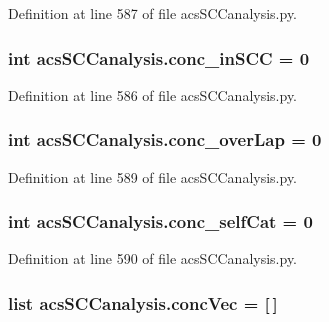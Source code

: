 Definition at line 587 of file acs\+S\+C\+Canalysis.\+py.

\hypertarget{a00130_a3fcb8f9c7e88b5c53f1201a383b38666}{
\subsubsection[{conc\+\_\+in\+S\+C\+C}]{\setlength{\rightskip}{0pt plus 5cm}int acs\+S\+C\+Canalysis.\+conc\+\_\+in\+S\+C\+C = 0}}\label{a00130_a3fcb8f9c7e88b5c53f1201a383b38666}


Definition at line 586 of file acs\+S\+C\+Canalysis.\+py.

\hypertarget{a00130_afd3169174539244248b78c8da2bba265}{
\subsubsection[{conc\+\_\+over\+Lap}]{\setlength{\rightskip}{0pt plus 5cm}int acs\+S\+C\+Canalysis.\+conc\+\_\+over\+Lap = 0}}\label{a00130_afd3169174539244248b78c8da2bba265}


Definition at line 589 of file acs\+S\+C\+Canalysis.\+py.

\hypertarget{a00130_a9e8cc07f7d7f892f3f72274318dcbcef}{
\subsubsection[{conc\+\_\+self\+Cat}]{\setlength{\rightskip}{0pt plus 5cm}int acs\+S\+C\+Canalysis.\+conc\+\_\+self\+Cat = 0}}\label{a00130_a9e8cc07f7d7f892f3f72274318dcbcef}


Definition at line 590 of file acs\+S\+C\+Canalysis.\+py.

\hypertarget{a00130_a1681853ab5f5859e51f219caa07a8539}{
\subsubsection[{conc\+Vec}]{\setlength{\rightskip}{0pt plus 5cm}list acs\+S\+C\+Canalysis.\+conc\+Vec = \mbox{[}$\,$\mbox{]}}}\label{a00130_a1681853ab5f5859e51f219caa07a8539}


